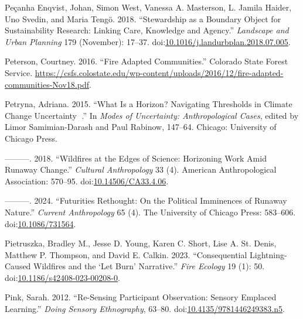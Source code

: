 \documentclass[
]{article}
\newlength{\cslhangindent}
\newenvironment{CSLReferences}[2] %
 {\begin{list}{}{%
  \setlength{\itemindent}{0pt}
  \setlength{\leftmargin}{0pt}
  \setlength{\parsep}{0pt}
  \ifodd #1
   \setlength{\leftmargin}{\cslhangindent}
   \setlength{\itemindent}{-1\cslhangindent}
  \fi
  \setlength{\itemsep}{#2\baselineskip}}}
 {\end{list}}
\begin{document}
\begin{CSLReferences}{1}{0}
Peçanha Enqvist, Johan, Simon West, Vanessa A. Masterson, L. Jamila Haider, Uno Svedin, and Maria Tengö. 2018. {``Stewardship as a Boundary Object for Sustainability Research: {Linking} Care, Knowledge and Agency.''} \emph{Landscape and Urban Planning} 179 (November): 17--37. doi:\href{https://doi.org/10.1016/j.landurbplan.2018.07.005}{10.1016/j.landurbplan.2018.07.005}.

Peterson, Courtney. 2016. {``Fire {Adapted Communities}.''} Colorado State Forest Service. \url{https://csfs.colostate.edu/wp-content/uploads/2016/12/fire-adapted-communities-Nov18.pdf}.

Petryna, Adriana. 2015. {``What Is a {Horizon}? {Navigating Thresholds} in {Climate Change Uncertainty} .''} In \emph{Modes of {Uncertainty}: {Anthropological Cases}}, edited by Limor Samimian-Darash and Paul Rabinow, 147--64. Chicago: University of Chicago Press.

---------. 2018. {``Wildfires at the {Edges} of {Science}: {Horizoning Work} Amid {Runaway Change}.''} \emph{Cultural Anthropology} 33 (4). American Anthropological Association: 570--95. doi:\href{https://doi.org/10.14506/CA33.4.06}{10.14506/CA33.4.06}.

---------. 2024. {``Futurities {Rethought}: {On} the {Political Imminences} of {Runaway Nature}.''} \emph{Current Anthropology} 65 (4). The University of Chicago Press: 583--606. doi:\href{https://doi.org/10.1086/731564}{10.1086/731564}.

Pietruszka, Bradley M., Jesse D. Young, Karen C. Short, Lise A. St. Denis, Matthew P. Thompson, and David E. Calkin. 2023. {``Consequential Lightning-Caused Wildfires and the {`Let Burn'} Narrative.''} \emph{Fire Ecology} 19 (1): 50. doi:\href{https://doi.org/10.1186/s42408-023-00208-0}{10.1186/s42408-023-00208-0}.

Pink, Sarah. 2012. {``Re-{Sensing Participant Observation}: {Sensory Emplaced Learning}.''} \emph{Doing Sensory Ethnography}, 63--80. doi:\href{https://doi.org/10.4135/9781446249383.n5}{10.4135/9781446249383.n5}.


\end{CSLReferences}
\end{document}
